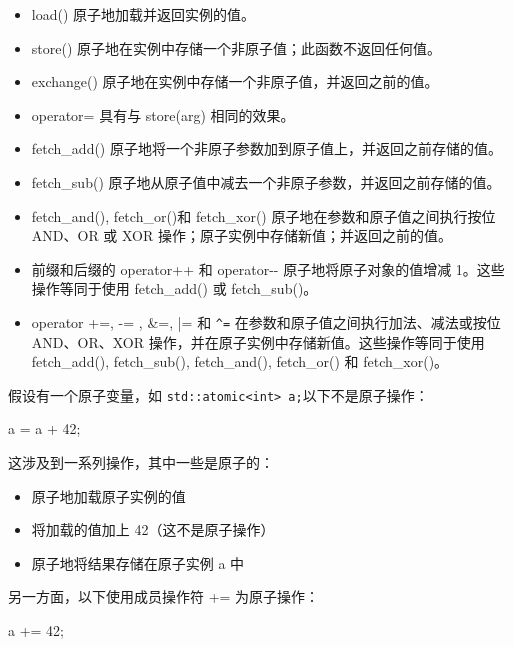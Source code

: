 \begin{itemize}
\item
load() 原子地加载并返回实例的值。

\item
store() 原子地在实例中存储一个非原子值；此函数不返回任何值。

\item
exchange() 原子地在实例中存储一个非原子值，并返回之前的值。

\item
operator= 具有与 store(arg) 相同的效果。

\item
fetch\_add() 原子地将一个非原子参数加到原子值上，并返回之前存储的值。

\item
fetch\_sub() 原子地从原子值中减去一个非原子参数，并返回之前存储的值。

\item
fetch\_and(), fetch\_or()和 fetch\_xor() 原子地在参数和原子值之间执行按位 AND、OR 或 XOR 操作；原子实例中存储新值；并返回之前的值。

\item
前缀和后缀的 operator++ 和 operator-{}- 原子地将原子对象的值增减 1。这些操作等同于使用 fetch\_add() 或 fetch\_sub()。

\item
operator +=, -= , \&=, |= 和 \verb|^=| 在参数和原子值之间执行加法、减法或按位 AND、OR、XOR 操作，并在原子实例中存储新值。这些操作等同于使用 fetch\_add(), fetch\_sub(), fetch\_and(), fetch\_or() 和 fetch\_xor()。
\end{itemize}

假设有一个原子变量，如 \verb|std::atomic<int> a;|以下不是原子操作：

\begin{cpp}
a = a + 42;
\end{cpp}

这涉及到一系列操作，其中一些是原子的：

\begin{itemize}
\item
原子地加载原子实例的值

\item
将加载的值加上 42（这不是原子操作）

\item
原子地将结果存储在原子实例 a 中
\end{itemize}

另一方面，以下使用成员操作符 += 为原子操作：

\begin{cpp}
a += 42;
\end{cpp}

